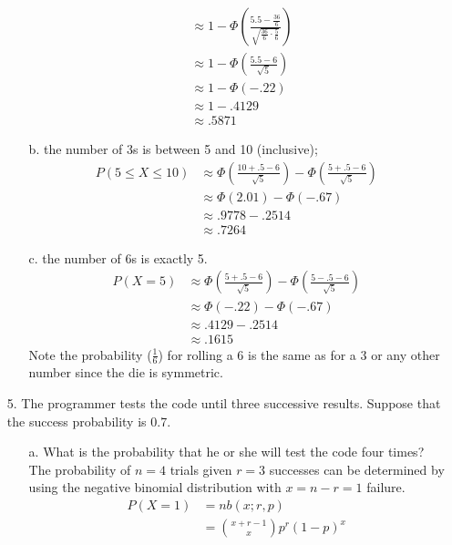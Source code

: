 \documentclass[letterpaper,12pt]{article}
\begin{document}
\begin{enumerate}
\begin{enumerate}
\begin{align*}
          &\approx 1 - \Phi\left(\frac{5.5 - \frac{36}{6}}{\sqrt{\frac{36}{6} \cdot \frac{5}{6}}}\right) \\
          &\approx 1 - \Phi\left(\frac{5.5 - 6}{\sqrt{5}}\right) \\
          &\approx 1 - \Phi(-.22) \\
          &\approx 1 - .4129 \\
          &\approx .5871
        \end{align*}
      \item[b.]
        the number of 3s is between 5 and 10 (inclusive);
        \begin{align*}
          P(5 \le X \le 10) &\approx \Phi\left(\frac{10 + .5 - 6}{\sqrt{5}}\right) - \Phi\left(\frac{5 + .5 - 6}{\sqrt{5}}\right) \\
          &\approx \Phi(2.01) - \Phi(-.67) \\
          &\approx .9778  - .2514 \\
          &\approx .7264
        \end{align*}
      \item[c.]
        the number of 6s is exactly 5.
        \begin{align*}
          P(X = 5) &\approx \Phi\left(\frac{5 + .5 - 6}{\sqrt{5}}\right) - \Phi\left(\frac{5 - .5 - 6}{\sqrt{5}}\right) \\
          &\approx \Phi(-.22)  - \Phi(-.67) \\
          &\approx .4129 - .2514 \\
          &\approx .1615
        \end{align*}
        Note the probability ($\frac{1}{6}$) for rolling a 6 is the same as for a 3 or any other number since the die is symmetric.
    \end{enumerate}
  \item[5.]
    The programmer tests the code until three successive results. Suppose that the success probability is 0.7.
    \begin{enumerate}
      \item[a.]
        What is the probability that he or she will test the code four times?
        \\
        The probability of $n = 4$ trials given $r = 3$ successes can be determined by using the negative binomial distribution with $x = n - r = 1$ failure.
        \begin{align*}
          P(X = 1) &= nb(x; r, p) \\
          &= \binom{x + r - 1}{x} p^r (1 - p)^x \\

\end{align*}
\end{enumerate}
\end{enumerate}
\end{document}
